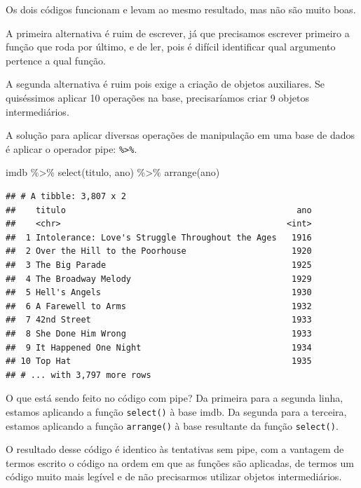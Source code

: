 \documentclass[
]{book}
\newenvironment{Shaded}{\begin{snugshade}}{\end{snugshade}}
\newcommand{\FunctionTok}[1]{\textcolor[rgb]{0.00,0.00,0.00}{#1}}
\newcommand{\NormalTok}[1]{#1}
\newcommand{\SpecialCharTok}[1]{\textcolor[rgb]{0.00,0.00,0.00}{#1}}
\begin{document}
Os dois códigos funcionam e levam ao mesmo resultado, mas não são muito boas.

A primeira alternativa é ruim de escrever, já que precisamos escrever primeiro a função que roda por último, e de ler, pois é difícil identificar qual argumento pertence a qual função.

A segunda alternativa é ruim pois exige a criação de objetos auxiliares. Se quiséssimos aplicar 10 operações na base, precisaríamos criar 9 objetos intermediários.

A solução para aplicar diversas operações de manipulação em uma base de dados é aplicar o operador pipe: \texttt{\%\textgreater{}\%}.

\begin{Shaded}
\begin{Highlighting}[]
\NormalTok{imdb }\SpecialCharTok{\%\textgreater{}\%} 
  \FunctionTok{select}\NormalTok{(titulo, ano) }\SpecialCharTok{\%\textgreater{}\%} 
  \FunctionTok{arrange}\NormalTok{(ano)}
\end{Highlighting}
\end{Shaded}

\begin{verbatim}
## # A tibble: 3,807 x 2
##    titulo                                              ano
##    <chr>                                             <int>
##  1 Intolerance: Love's Struggle Throughout the Ages   1916
##  2 Over the Hill to the Poorhouse                     1920
##  3 The Big Parade                                     1925
##  4 The Broadway Melody                                1929
##  5 Hell's Angels                                      1930
##  6 A Farewell to Arms                                 1932
##  7 42nd Street                                        1933
##  8 She Done Him Wrong                                 1933
##  9 It Happened One Night                              1934
## 10 Top Hat                                            1935
## # ... with 3,797 more rows
\end{verbatim}

O que está sendo feito no código com pipe? Da primeira para a segunda linha, estamos aplicando a função \texttt{select()} à base imdb. Da segunda para a terceira, estamos aplicando a função \texttt{arrange()} à base resultante da função \texttt{select()}.

O resultado desse código é identico às tentativas sem pipe, com a vantagem de termos escrito o código na ordem em que as funções são aplicadas, de termos um código muito mais legível e de não precisarmos utilizar objetos intermediários.
\end{document}
